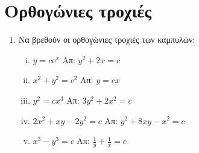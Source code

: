 \documentclass[a4paper,table]{report}
\begin{document}
\section*{Ορθογώνιες τροχιές}

\begin{enumerate}
  \item Να βρεθούν οι ορθογώνιες τροχιές των καμπυλών:

    \begin{enumerate}[i)]
      \item $ y=c \mathrm{e}^{x} $ \hfill Απ: $ y^{2}+2x=c $ %
      \item $ x^{2}+y^{2}=c^{2} $ \hfill Απ: $ y=cx $  %
      \item $ y^{2}=cx^{3} $ \hfill Απ: $ 3y^{2}+2x^{2}=c $ 
      \item $ 2x^{2}+xy-2y^{2}=c $ \hfill Απ: $ y^{2}+8xy-x^{2}=c $ 
      \item $ x^{3}-y^{3}=c $ \hfill Απ: $ \frac{1}{y} + \frac{1}{x} =c $ 
    \end{enumerate}
\end{enumerate}
\end{document}
